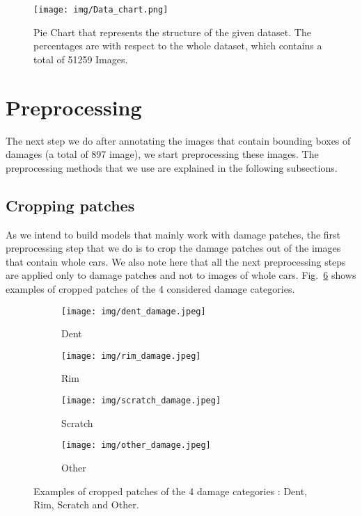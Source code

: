 \documentclass[lang=english,inputenc=utf8,fontsize=10pt]{ldvarticle}
\begin{document}
\begin{figure}[htb]
\centering
  \texttt{[image: img/Data\_chart.png]}
  \caption[]{Pie Chart that represents the structure of the given dataset. The percentages are with respect to the whole dataset, which contains a total of 51259 Images.}
  \label{fig:Data_chart}
\end{figure}




\section*{Preprocessing}
The next step we do after annotating the images that contain bounding boxes of damages (a total of 897 image), we start preprocessing these images. The preprocessing methods that we use are explained in the following subsections.

\subsection*{Cropping patches}
As we intend to build models that mainly work with damage patches, the first preprocessing step that we do is to crop the damage patches out of the images that contain whole cars. We also note here that all the next preprocessing steps are applied only to damage patches and not to images of whole cars. Fig.~\ref{fig:cropped_patches} shows examples of cropped patches of the 4 considered damage categories.

\begin{figure}
    \centering
    \begin{subfigure}{0.24\textwidth}
        \texttt{[image: img/dent\_damage.jpeg]}
        \caption{Dent\label{fig:dent}}
        
    \end{subfigure} 
    \begin{subfigure}{0.24\textwidth}
            \texttt{[image: img/rim\_damage.jpeg]}
            \caption{Rim\label{fig:rim}}
            
    \end{subfigure}
    \begin{subfigure}{0.24\textwidth}
            \texttt{[image: img/scratch\_damage.jpeg]}
            \caption{Scratch\label{fig:scratch}}
            
    \end{subfigure}
    \begin{subfigure}{0.24\textwidth}
            \texttt{[image: img/other\_damage.jpeg]}
            \caption{Other\label{fig:other}}
            
    \end{subfigure}

\caption[]{Examples of cropped patches of the 4 damage categories : Dent, Rim, Scratch and Other.}
\label{fig:cropped_patches}
\end{figure}
\end{document}
